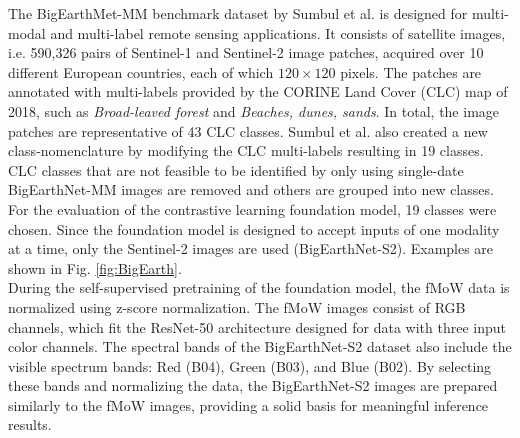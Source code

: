 The BigEarthMet-MM benchmark dataset by Sumbul et al. \cite{bigEartNetMM} is designed for multi-modal and multi-label remote sensing applications. It consists of satellite images, i.e.  590,326 pairs of Sentinel-1 and Sentinel-2 image patches, acquired over 10 different European countries, each of which $120\times120$ pixels. The patches are annotated with multi-labels provided by the CORINE Land Cover (CLC) map of 2018, such as \textit{Broad-leaved forest} and \textit{Beaches, dunes, sands}. In total, the image patches are representative of 43 CLC classes. Sumbul et al. \cite{bigEartNetMM} also created a new class-nomenclature by modifying the CLC multi-labels resulting in 19 classes. CLC classes that are not feasible to be identified by only using single-date BigEarthNet-MM images are removed and others are grouped into new classes. \\
For the evaluation of the contrastive learning foundation model, 19 classes were chosen. Since the foundation model is designed to accept inputs of one modality at a time, only the Sentinel-2 images are used (BigEarthNet-S2). Examples are shown in Fig. \ref{fig:BigEarth}. \\
During the self-supervised pretraining of the foundation model, the fMoW data is normalized using z-score normalization. The fMoW images consist of RGB channels, which fit the ResNet-50 architecture designed for data with three input color channels. The spectral bands of the BigEarthNet-S2 dataset also include the visible spectrum bands: Red (B04), Green (B03), and Blue (B02). By selecting these bands and normalizing the data, the BigEarthNet-S2 images are prepared similarly to the fMoW images, providing a solid basis for meaningful inference results.

